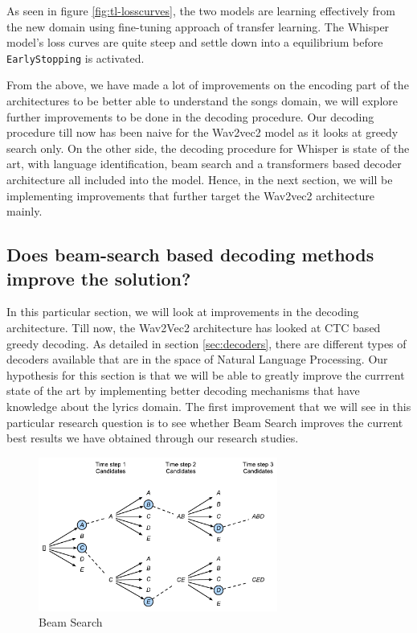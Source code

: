 As seen in figure \ref{fig:tl-losscurves}, the two models are learning effectively from the new domain using fine-tuning approach of transfer learning. The Whisper model's loss curves are quite steep and settle down into a equilibrium before \texttt{EarlyStopping} is activated. 

From the above, we have made a lot of improvements on the encoding part of the architectures to be better able to understand the songs domain, we will explore further improvements to be done in the decoding procedure. Our decoding procedure till now has been naive for the Wav2vec2 model as it looks at greedy search only. On the other side, the decoding procedure for Whisper is state of the art, with language identification, beam search and a transformers based decoder architecture all included into the model. Hence, in the next section, we will be implementing improvements that further target the Wav2vec2 architecture mainly.
 
 
\subsection{Does beam-search based decoding methods improve the solution?}

In this particular section, we will look at improvements in the decoding architecture. Till now, the Wav2Vec2 architecture has looked at CTC based greedy decoding. As detailed in section \ref{sec:decoders}, there are different types of decoders available that are in the space of Natural Language Processing. Our hypothesis for this section is that we will be able to greatly improve the currrent state of the art by implementing better decoding mechanisms that have knowledge about the lyrics domain. The first improvement that we will see in this particular research question is to see whether Beam Search improves the current best results we have obtained through our research studies. 


    \begin{figure}
    \centering
    \includegraphics[width=0.7\textwidth]{05-research study/figures/beam-search.pdf}
    \caption{Beam Search \cite{zhang2023dive}}
    \label{fig:beamsearch}
\end{figure}

